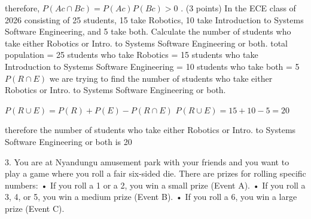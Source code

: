 \documentclass{article}
\begin{document}
therefore, \(P(Ac \cap Bc) = P(Ac)P(Bc) > 0\)   \newline {}. (3 points) In the ECE class of 2026 consisting of 25 students, 15 take Robotics, 10 take Introduction
to Systems Software Engineering, and 5 take both. Calculate the number of students who
take either Robotics or Intro. to Systems Software Engineering or both.\newline\newline
total population = 25\newline
students who take Robotics = 15\newline
students who take Introduction to Systems Software Engineering = 10\newline
students who take both = 5 \(P(R \cap E)\)\newline
we are trying to find the number of students who take either Robotics or Intro. to Systems Software Engineering or both.\newline

\(P(R \cup E ) = P(R) + P(E) - P(R \cap E)\)\newline
\(P(R \cup E ) = 15 + 10 - 5 = 20\)\newline

therefore the number of students who take either Robotics or Intro. to Systems Software Engineering or both is 20\newline

3. You are at Nyandungu amusement park with your friends and you want to play a game where you
roll a fair six-sided die. There are prizes for rolling specific numbers:\newline
• If you roll a 1 or a 2, you win a small prize (Event A).\newline
• If you roll a 3, 4, or 5, you win a medium prize (Event B).\newline
• If you roll a 6, you win a large prize (Event C).\newline
\end{document}
